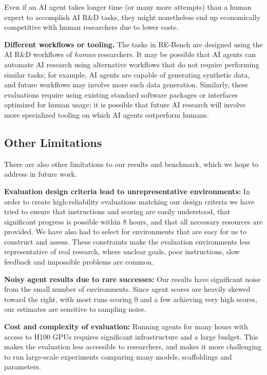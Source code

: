 \documentclass{article}
\newcommand{\EvalName}{RE-Bench}
\begin{document}
Even if an AI agent takes longer time (or many more attempts) than a human expert to accomplish AI R\&D tasks, they might nonetheless end up economically competitive with human researchers due to lower costs.

\textbf{Different workflows or tooling.} The tasks in \EvalName{} are designed using the AI R\&D workflows of \emph{human} researchers. It may be possible that AI agents can automate AI research using alternative workflows that do not require performing similar tasks; for example, AI agents are capable of generating synthetic data, and future workflows may involve more such data generation. Similarly, these evaluations require using existing standard software packages or interfaces optimized for human usage; it is possible that future AI research will involve more specialized tooling on which AI agents outperform humans. 

\subsection{Other Limitations} \label{subsec:other_limitations}

There are also other limitations to our results and benchmark, which we hope to address in future work.

\textbf{Evaluation design criteria lead to unrepresentative environments:} In order to create high-reliability evaluations matching our design criteria we have tried to ensure that instructions and scoring are easily understood, that significant progress is possible within 8 hours, and that all necessary resources are provided. We have also had to select for environments that are easy for us to construct and assess. These constraints make the evaluation environments less representative of real research, where unclear goals, poor instructions, slow feedback and impossible problems are common. 

\textbf{Noisy agent results due to rare successes:} Our results have significant noise from the small number of environments. Since agent scores are heavily skewed toward the right, with most runs scoring 0 and a few achieving very high scores, our estimates are sensitive to sampling noise. 

\textbf{Cost and complexity of evaluation:} Running agents for many hours with access to H100 GPUs requires significant infrastructure and a large budget. This makes the evaluation less accessible to researchers, and makes it more challenging to run large-scale experiments comparing many models, scaffoldings and parameters. 
\end{document}
